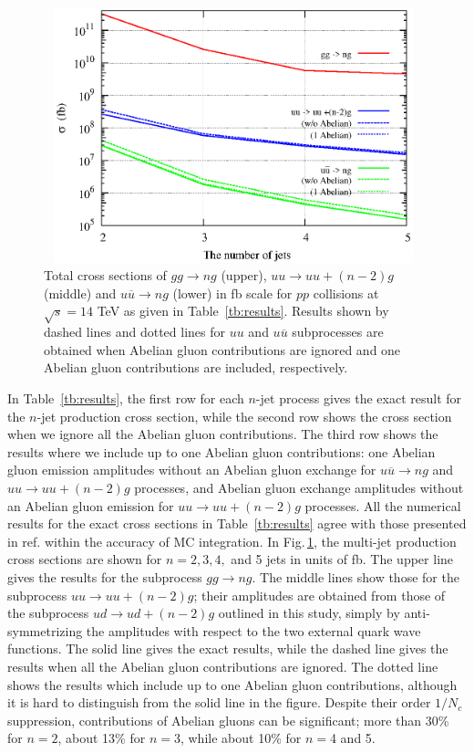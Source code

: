 \documentclass[a4paper,11pt]{article}
\begin{document}
\begin{figure}
\begin{center}
\includegraphics[width=110mm,height=74mm]{./figures/cross2.eps}
\caption{Total cross sections of $gg\rightarrow ng$ (upper),
 $uu\rightarrow uu+(n-2)g$ (middle) and
 $u\overline{u}\rightarrow ng$ (lower)
 in fb scale for $pp$ collisions at
 $\sqrt{s}=14$ TeV as given in Table~\ref{tb:results}.
 Results shown by dashed lines and dotted lines for $uu$ and $u\overline{u}$
 subprocesses are obtained when Abelian gluon contributions
 are ignored and one Abelian gluon contributions are included, respectively.}
\label{fig:results}
\end{center}
\end{figure}
In Table~\ref{tb:results}, the first row for each $n$-jet process gives the
 exact result for the $n$-jet production cross section, while the
 second row shows the cross section when we ignore all the Abelian
 gluon contributions. The third row shows the results where we include up to one Abelian
 gluon contributions: one Abelian gluon emission amplitudes without an
 Abelian gluon exchange for $u\overline{u}\rightarrow ng$ and $uu\rightarrow
 uu+(n-2)g$ processes, and Abelian gluon
 exchange amplitudes without an Abelian gluon emission for $uu\rightarrow
 uu+(n-2)g$ processes.
 All the numerical results for the exact cross
 sections in Table~\ref{tb:results}
 agree with those
 presented in ref.\cite{GPU2} within the accuracy of MC integration.
 In Fig.\,\ref{fig:results}, the multi-jet production cross sections
 are shown for $n=2, 3, 4,$ and 5 jets in units of fb.
 The upper line gives the results for the subprocess $gg\rightarrow ng$.
 The middle lines show those for the subprocess
 $uu\rightarrow uu+(n-2)g$; their amplitudes are obtained from those of
 the
 subprocess
 $ud\rightarrow ud+(n-2)g$ outlined in this study,
 simply by anti-symmetrizing the amplitudes with respect
 to the two external quark wave functions. The solid line gives the
 exact results, while the dashed line gives
 the results when all the Abelian gluon contributions are
 ignored. The dotted line shows the results which include up to one Abelian gluon
 contributions, although it is hard to distinguish from the solid line
 in the figure. Despite their order $1/N_c$ suppression, contributions of Abelian gluons can be significant;
 more than 30\% for $n=2$, about 13\% for $n=3$, while
 about 10\% for $n=$4 and 5.
\end{document}
